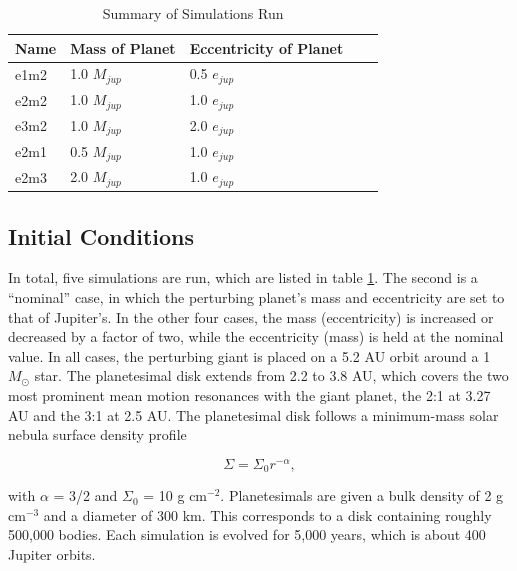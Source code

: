 \documentclass[twocolumn]{aastex63}
\begin{document}
\begin{table}
\begin{center}
\caption{Summary of Simulations Run}
\begin{tabular}{lllll} \hline \hline
Name     & Mass of Planet & Eccentricity of Planet &  &  \\ \hline
e1m2 & 1.0 $M_{jup}$                     & 0.5 $e_{jup}$                            &  &  \\
e2m2      & 1.0 $M_{jup}$                     & 1.0 $e_{jup}$                             &  &  \\
e3m2 & 1.0 $M_{jup}$                     & 2.0 $e_{jup}$                             &  &  \\
e2m1 & 0.5 $M_{jup}$                   & 1.0 $e_{jup}$                             &  &  \\
e2m3 & 2.0 $M_{jup}$                     & 1.0 $e_{jup}$                             &  &  \\ \hline
\end{tabular}
\label{tab:sims}
\end{center}
\end{table}

\subsection{Initial Conditions}\label{sec:ics}

In total, five simulations are run, which are listed in table
\ref{tab:sims}. The second
is a ``nominal'' case, in which the perturbing planet's mass and 
eccentricity are set to that of Jupiter's. In the other four cases, the mass (eccentricity) is increased or decreased by a factor of two, while the 
eccentricity (mass) is held at the nominal value. In all cases, the perturbing giant is placed on a 5.2 AU orbit around a 1 $M_{\odot}$ star. The 
planetesimal disk extends from 2.2 to 3.8 AU, which covers the two most prominent mean motion resonances with the giant planet, the 2:1 at 3.27 AU 
and the 3:1 at 2.5 AU. The planetesimal disk follows a minimum-mass solar nebula surface density profile \citep{1981PThPS..70...35H}

\begin{equation}\label{eq:surf_den}
	\Sigma = \Sigma_{0} r^{-\alpha},
\end{equation}

\noindent with $\alpha$ = 3/2 and $\Sigma_{0}$ = 10 g cm$^{-2}$. Planetesimals are given a bulk density of 2 g cm$^{-3}$ and a diameter of 
300 km. This corresponds to a disk containing roughly 500,000 bodies. Each simulation is evolved for 5,000 years, which is about 400 Jupiter 
orbits.
\end{document}
